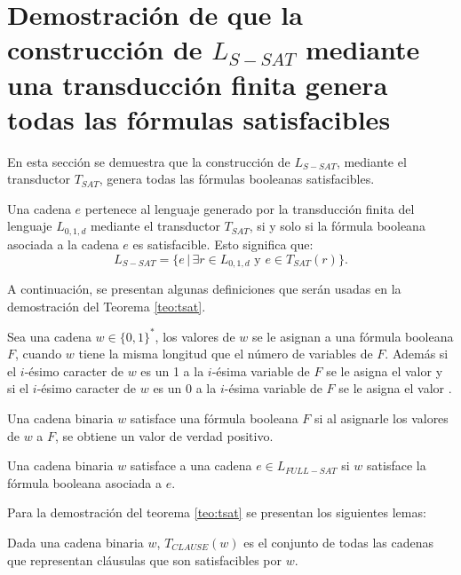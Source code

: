 \section{Demostración de que la construcción de $L_{S-SAT}$ mediante una transducción finita
  genera todas las fórmulas satisfacibles}

En esta sección se demuestra que la construcción de $L_{S-SAT}$, mediante el transductor $T_{SAT}$, genera todas las fórmulas booleanas satisfacibles.

\begin{theorem}
    \label{teo:tsat}
    Una cadena $e$ pertenece al lenguaje generado por la transducción finita del lenguaje $L_{0,1,d}$ mediante el transductor $T_{SAT}$, si y solo si la fórmula booleana asociada a la cadena $e$ es satisfacible. Esto significa que:
    $$L_{S-SAT} = \{e\,|\,\exists r \in L_{0,1,d} \text{ y } e \in T_{SAT}(r) \}.$$
\end{theorem}

A continuación, se presentan algunas definiciones que serán usadas en la demostración del Teorema \ref{teo:tsat}.

\begin{definition}
    Sea una cadena $w\in \{0,1\}^*$, los valores de $w$ se le asignan a una fórmula booleana $F$, cuando $w$ tiene la misma longitud
    que el número de variables de $F$. Además si el $i$-ésimo caracter de $w$ es un 1 a la $i$-ésima variable de $F$ se le asigna
    el valor \true{} y si el $i$-ésimo caracter de $w$ es un 0 a la $i$-ésima variable de $F$ se le asigna
    el valor \false{}.
\end{definition}

\begin{definition}
    Una cadena binaria $w$ satisface una fórmula booleana $F$ si al asignarle los valores de $w$ a $F$, se obtiene un valor de verdad positivo.
\end{definition}

\begin{definition}
    Una cadena binaria $w$ satisface a una cadena $e\in L_{FULL-SAT}$ si $w$ satisface la fórmula booleana asociada a $e$. 
\end{definition}

Para la demostración del teorema \ref{teo:tsat} se presentan los siguientes lemas:

\begin{lemma}
    \label{lem:clause}
    Dada una cadena binaria $w$, $T_{CLAUSE}(w)$ es el conjunto de todas las cadenas que representan cláusulas que son satisfacibles por $w$.
\end{lemma}

